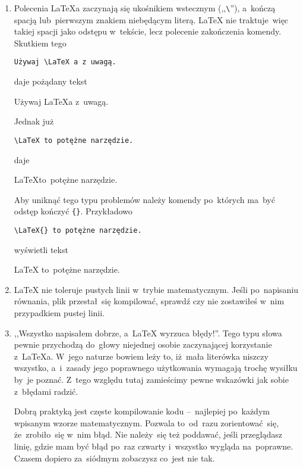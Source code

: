 \documentclass[a4paper,11pt]{article}
\newcommand{\tbs}{\textbackslash}  %
\begin{document}
\begin{enumerate}
\item Polecenia \LaTeX a zaczynają się ukośnikiem wstecznym
  (,,\texttt{\tbs}''), a~kończą spacją lub~pierwszym znakiem
  niebędącym literą. \LaTeX{} nie traktuje~więc takiej spacji jako
  odstępu w~tekście, lecz polecenie zakończenia komendy. Skutkiem tego
  \begin{displayquote}
    \texttt{Używaj \tbs LaTeX a z~uwagą.}
  \end{displayquote}
  daje pożądany tekst
  \begin{displayquote}
    Używaj \LaTeX a z~uwagą.
  \end{displayquote}
  Jednak już
  \begin{displayquote}
    \texttt{\tbs LaTeX to~potężne narzędzie.}
  \end{displayquote}
  daje
  \begin{displayquote}
    \LaTeX to~potężne narzędzie.
  \end{displayquote}
  Aby uniknąć tego typu problemów należy komendy po~których ma~być
  odstęp kończyć \texttt{\{\}}. Przykładowo
  \begin{displayquote}
    \texttt{\tbs LaTeX\{\} to~potężne narzędzie.}
  \end{displayquote}
  wyświetli tekst
  \begin{displayquote}
    \LaTeX{} to~potężne narzędzie.
  \end{displayquote}

\item \LaTeX{} nie toleruje pustych linii w~trybie matematycznym.
  Jeśli po~napisaniu równania, plik przestał~się kompilować, sprawdź
  czy nie zostawiłeś w~nim przypadkiem pustej linii.

\item ,,Wszystko napisałem dobrze, a~\LaTeX{} wyrzuca błędy!''. Tego
  typu słowa pewnie przychodzą do~głowy niejednej osobie zaczynającej
  korzystanie z~\LaTeX a. W~jego naturze bowiem leży to, iż~mała
  literówka niszczy wszystko, a~i~zasady jego poprawnego użytkowania
  wymagają trochę wysiłku by~je poznać. Z~tego względu tutaj
  zamieścimy pewne wskazówki jak sobie z~błędami radzić.

  Dobrą praktyką jest częste kompilowanie kodu --~najlepiej po~każdym
  wpisanym wzorze matematycznym. Pozwala to~od~razu zorientować~się,
  że~zrobiło~się w~nim błąd. Nie należy~się też poddawać, jeśli
  przeglądasz linię, gdzie mam być błąd po~raz czwarty i~wszystko
  wygląda na~poprawne. Czasem dopiero za~siódmym zobaczysz co~jest nie
  tak.


\end{enumerate}
\end{document}
